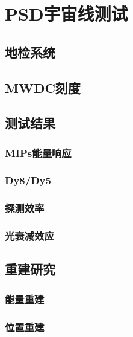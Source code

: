 \chapter{PSD宇宙线测试}

\section{地检系统}

\section{MWDC刻度}

\section{测试结果}
\subsection{MIPs能量响应}
\subsection{Dy8/Dy5}
\subsection{探测效率}
\subsection{光衰减效应}

\section{重建研究}
\subsection{能量重建}
\subsection{位置重建}
